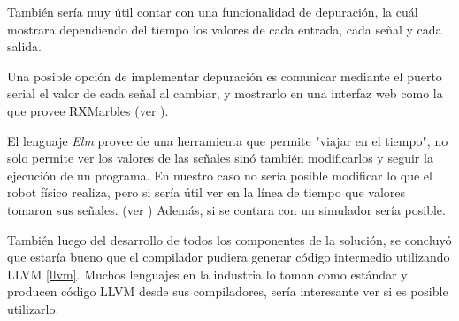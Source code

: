   También sería muy útil contar con una funcionalidad de depuración, la cuál
mostrara dependiendo del tiempo los valores de cada entrada, cada señal y cada
salida.

  Una posible opción de implementar depuración es comunicar
mediante el puerto serial el valor de cada señal al cambiar,
y mostrarlo en una interfaz web como la que provee
RXMarbles (ver \cite{rxmarbles}). 

  El lenguaje \textit{Elm} provee de una herramienta que permite "viajar en el 
tiempo", no solo permite ver los valores de las señales sinó también
modificarlos y seguir la ejecución de un programa.
  En nuestro caso no sería posible modificar lo que el robot físico
realiza, pero si sería útil ver en la línea de tiempo que valores
tomaron sus señales. (ver \cite{elmdebug}) Además, si se contara
con un simulador sería posible.

  También luego del desarrollo de todos los componentes de la solución,
se concluyó que estaría bueno que el compilador pudiera generar código
intermedio utilizando LLVM \ref{llvm}.
Muchos lenguajes en la industria lo toman como estándar y producen
código LLVM desde sus compiladores, sería interesante ver si es posible
utilizarlo.
